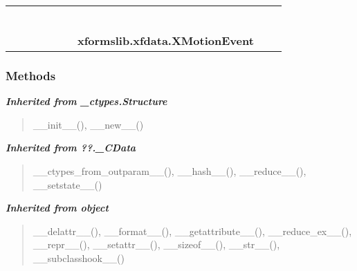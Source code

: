     \label{xformslib:xfdata:XMotionEvent}
\begin{tabular}{cccccccccc}
\multicolumn{2}{r}{\settowidth{\BCL}{object}\multirow{2}{\BCL}{object}}
&&
&&
&&
  \\\cline{3-3}
  &&\multicolumn{1}{c|}{}
&&
&&
&&
  \\
\multicolumn{4}{r}{\settowidth{\BCL}{??.\_CData}\multirow{2}{\BCL}{??.\_CData}}
&&
&&
  \\\cline{5-5}
  &&&&\multicolumn{1}{c|}{}
&&
&&
  \\
\multicolumn{6}{r}{\settowidth{\BCL}{\_ctypes.Structure}\multirow{2}{\BCL}{\_ctypes.Structure}}
&&
  \\\cline{7-7}
  &&&&&&\multicolumn{1}{c|}{}
&&
  \\
&&&&&&\multicolumn{2}{l}{\textbf{xformslib.xfdata.XMotionEvent}}
\end{tabular}



  \subsubsection{Methods}


\large{\textbf{\textit{Inherited from \_ctypes.Structure}}}

\begin{quote}
\_\_init\_\_(), \_\_new\_\_()
\end{quote}

\large{\textbf{\textit{Inherited from ??.\_CData}}}

\begin{quote}
\_\_ctypes\_from\_outparam\_\_(), \_\_hash\_\_(), \_\_reduce\_\_(), \_\_setstate\_\_()
\end{quote}

\large{\textbf{\textit{Inherited from object}}}

\begin{quote}
\_\_delattr\_\_(), \_\_format\_\_(), \_\_getattribute\_\_(), \_\_reduce\_ex\_\_(), \_\_repr\_\_(), \_\_setattr\_\_(), \_\_sizeof\_\_(), \_\_str\_\_(), \_\_subclasshook\_\_()
\end{quote}


